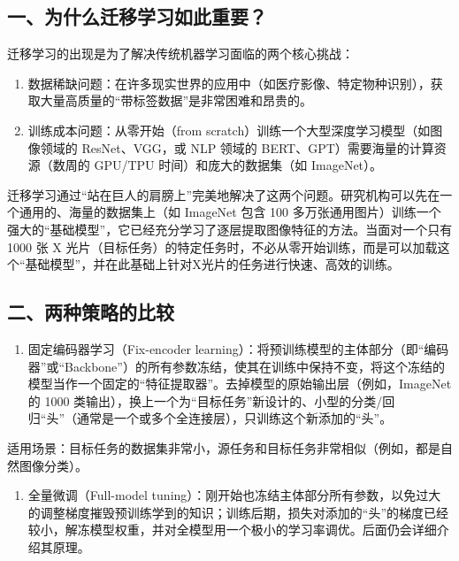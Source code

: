 \hypertarget{ux4e00ux4e3aux4ec0ux4e48ux8fc1ux79fbux5b66ux4e60ux5982ux6b64ux91cdux8981}{%
\subsection{一、为什么迁移学习如此重要？}\label{ux4e00ux4e3aux4ec0ux4e48ux8fc1ux79fbux5b66ux4e60ux5982ux6b64ux91cdux8981}}

迁移学习的出现是为了解决传统机器学习面临的两个核心挑战：

\begin{enumerate}
\def\labelenumi{\arabic{enumi}.}
\item
  数据稀缺问题：在许多现实世界的应用中（如医疗影像、特定物种识别），获取大量高质量的``带标签数据''是非常困难和昂贵的。
\item
  训练成本问题：从零开始（from scratch）训练一个大型深度学习模型（如图像领域的 ResNet、VGG，或 NLP 领域的 BERT、GPT）需要海量的计算资源（数周的 GPU/TPU 时间）和庞大的数据集（如 ImageNet）。
\end{enumerate}

迁移学习通过``站在巨人的肩膀上''完美地解决了这两个问题。研究机构可以先在一个通用的、海量的数据集上（如 ImageNet 包含 100 多万张通用图片）训练一个强大的``基础模型''，它已经充分学习了逐层提取图像特征的方法。当面对一个只有 1000 张 X 光片（目标任务）的特定任务时，不必从零开始训练，而是可以加载这个``基础模型''，并在此基础上针对X光片的任务进行快速、高效的训练。

\hypertarget{ux4e8cux4e24ux79cdux7b56ux7565ux7684ux6bd4ux8f83}{%
\subsection{二、两种策略的比较}\label{ux4e8cux4e24ux79cdux7b56ux7565ux7684ux6bd4ux8f83}}

\begin{enumerate}
\def\labelenumi{\arabic{enumi}.}
\tightlist
\item
  固定编码器学习（Fix-encoder learning）：将预训练模型的主体部分（即``编码器''或``Backbone''）的所有参数冻结，使其在训练中保持不变，将这个冻结的模型当作一个固定的``特征提取器''。去掉模型的原始输出层（例如，ImageNet 的 1000 类输出），换上一个为``目标任务''新设计的、小型的分类/回归``头''（通常是一个或多个全连接层），只训练这个新添加的``头''。
\end{enumerate}

适用场景：目标任务的数据集非常小，源任务和目标任务非常相似（例如，都是自然图像分类）。

\begin{enumerate}
\def\labelenumi{\arabic{enumi}.}
\setcounter{enumi}{1}
\tightlist
\item
  全量微调（Full-model tuning）：刚开始也冻结主体部分所有参数，以免过大的调整梯度摧毁预训练学到的知识；训练后期，损失对添加的``头''的梯度已经较小，解冻模型权重，并对全模型用一个极小的学习率调优。后面仍会详细介绍其原理。
\end{enumerate}

